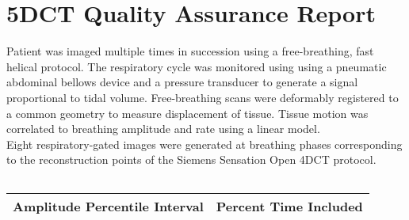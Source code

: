 \documentclass[12pt,titlepage]{article}
\begin{document}
\section*{5DCT Quality Assurance Report}



\noindent Patient was imaged multiple times in succession using a
free-breathing, fast helical protocol.  The respiratory cycle was monitored
using using a pneumatic abdominal bellows device and a pressure transducer to
generate a signal proportional to tidal volume.  Free-breathing scans were
deformably registered to a common geometry to measure displacement of tissue.
Tissue motion was correlated to breathing amplitude and rate using a linear
model. \\

\noindent Eight respiratory-gated images were generated at breathing phases
corresponding to the reconstruction points of the Siemens Sensation Open 4DCT protocol.

\medskip


\begin{table}[h!]
	\centering
\begin{tabular}{cc} \toprule
	\midrule

\bottomrule
\end{tabular}
\end{table}

\begin{figure}[h!]
	\centering

\end{figure}
	
\clearpage
\begin{figure}[h!]
	\centering
\end{figure}

\begin{table}[h!]
	\centering
\begin{tabular}{cc} \toprule
Amplitude Percentile Interval & Percent Time Included\\ \midrule


\bottomrule
\end{tabular}
\end{table}
\end{document}
